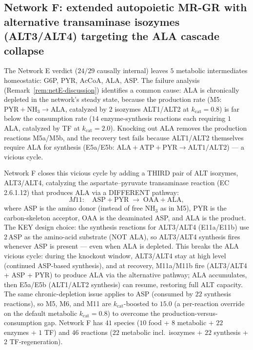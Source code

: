 \documentclass[11pt,a4paper]{article}
\theoremstyle{plain}
\theoremstyle{definition}
\theoremstyle{remark}
\begin{document}
\subsection{Network F: extended autopoietic MR-GR with alternative
transaminase isozymes (ALT3/ALT4) targeting the ALA cascade collapse}
\label{sec:autopoiesis-network-F}

The Network E verdict ($24/29$ causally internal) leaves $5$ metabolic
intermediates homeostatic: G6P, PYR, AcCoA, ALA, ASP. The failure
analysis (Remark~\ref{rem:netE-discussion}) identifies a common cause:
ALA is chronically depleted in the network's steady state, because the
production rate (M5: $\mathrm{PYR} + \mathrm{NH}_3 \to \mathrm{ALA}$,
catalyzed by $2$ isozymes ALT1/ALT2 at $k_{\mathrm{cat}} = 0.8$) is far
below the consumption rate ($14$ enzyme-synthesis reactions each
requiring $1$ ALA, catalyzed by TF at $k_{\mathrm{cat}} = 2.0$).
Knocking out ALA removes the production reactions M5a/M5b, and the
recovery test fails because ALT1/ALT2 themselves require ALA for
synthesis (E5a/E5b: $\mathrm{ALA} + \mathrm{ATP} + \mathrm{PYR} \to
\mathrm{ALT1}/\mathrm{ALT2}$) --- a vicious cycle.

Network F closes this vicious cycle by adding a THIRD pair of ALT
isozymes, ALT3/ALT4, catalyzing the aspartate--pyruvate transaminase
reaction (EC 2.6.1.12) that produces ALA via a DIFFERENT pathway:
\begin{equation}\label{eq:netF-M11}
  M11: \quad \mathrm{ASP} + \mathrm{PYR} \;\to\; \mathrm{OAA} +
  \mathrm{ALA},
\end{equation}
where ASP is the amino donor (instead of free $\mathrm{NH}_3$ as in
M5), PYR is the carbon-skeleton acceptor, OAA is the deaminated ASP,
and ALA is the product. The KEY design choice: the synthesis reactions
for ALT3/ALT4 (E11a/E11b) use $2\,\mathrm{ASP}$ as the amino-acid
substrate (NOT ALA), so ALT3/ALT4 synthesis fires whenever ASP is
present --- even when ALA is depleted. This breaks the ALA vicious
cycle: during the knockout window, ALT3/ALT4 stay at high level
(continued ASP-based synthesis), and at recovery, M11a/M11b fire
(ALT3/ALT4 + ASP + PYR) to produce ALA via the alternative pathway;
ALA accumulates, then E5a/E5b (ALT1/ALT2 synthesis) can resume,
restoring full ALT capacity. The same chronic-depletion issue applies
to ASP (consumed by $22$ synthesis reactions), so M5, M6, and M11 are
$k_{\mathrm{cat}}$-boosted to $15.0$ (a per-reaction override on the
default metabolic $k_{\mathrm{cat}} = 0.8$) to overcome the
production-versus-consumption gap. Network F has $41$ species ($10$
food + $8$ metabolic + $22$ enzymes + $1$ TF) and $46$ reactions ($22$
metabolic incl.~isozymes + $22$ synthesis + $2$ TF-regeneration).
\end{document}
